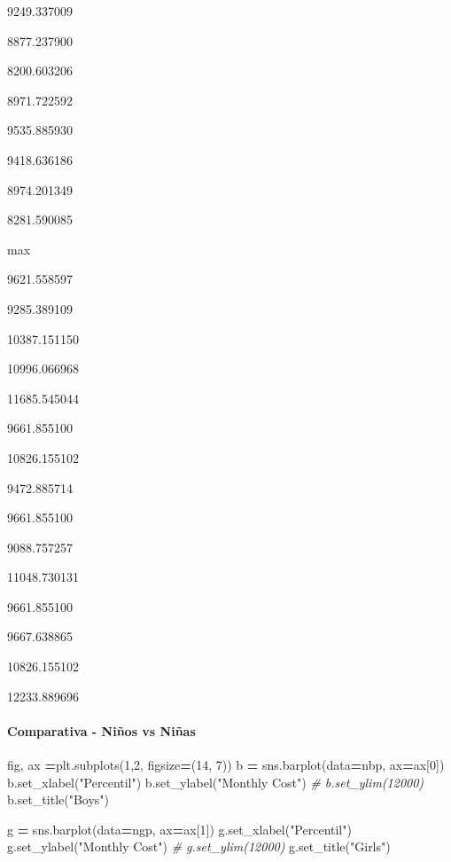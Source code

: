 \documentclass[
]{article}
\newenvironment{Shaded}{\begin{snugshade}}{\end{snugshade}}
\newcommand{\CommentTok}[1]{\textcolor[rgb]{0.56,0.35,0.01}{\textit{#1}}}
\newcommand{\DecValTok}[1]{\textcolor[rgb]{0.00,0.00,0.81}{#1}}
\newcommand{\NormalTok}[1]{#1}
\newcommand{\OperatorTok}[1]{\textcolor[rgb]{0.81,0.36,0.00}{\textbf{#1}}}
\newcommand{\StringTok}[1]{\textcolor[rgb]{0.31,0.60,0.02}{#1}}
\begin{document}
9249.337009

8877.237900

8200.603206

8971.722592

9535.885930

9418.636186

8974.201349

8281.590085

max

9621.558597

9285.389109

10387.151150

10996.066968

11685.545044

9661.855100

10826.155102

9472.885714

9661.855100

9088.757257

11048.730131

9661.855100

9667.638865

10826.155102

12233.889696

\hypertarget{comparativa---niuxf1os-vs-niuxf1as}{%
\paragraph{Comparativa - Niños vs
Niñas}\label{comparativa---niuxf1os-vs-niuxf1as}}

\begin{Shaded}
\begin{Highlighting}[]
\NormalTok{fig, ax }\OperatorTok{=}\NormalTok{plt.subplots(}\DecValTok{1}\NormalTok{,}\DecValTok{2}\NormalTok{, figsize}\OperatorTok{=}\NormalTok{(}\DecValTok{14}\NormalTok{, }\DecValTok{7}\NormalTok{))}
\NormalTok{b }\OperatorTok{=}\NormalTok{ sns.barplot(data}\OperatorTok{=}\NormalTok{nbp, ax}\OperatorTok{=}\NormalTok{ax[}\DecValTok{0}\NormalTok{])}
\NormalTok{b.set\_xlabel(}\StringTok{"Percentil"}\NormalTok{)}
\NormalTok{b.set\_ylabel(}\StringTok{"Monthly Cost"}\NormalTok{)}
\CommentTok{\# b.set\_ylim(12000)}
\NormalTok{b.set\_title(}\StringTok{"Boys"}\NormalTok{)}

\NormalTok{g }\OperatorTok{=}\NormalTok{ sns.barplot(data}\OperatorTok{=}\NormalTok{ngp, ax}\OperatorTok{=}\NormalTok{ax[}\DecValTok{1}\NormalTok{])}
\NormalTok{g.set\_xlabel(}\StringTok{"Percentil"}\NormalTok{)}
\NormalTok{g.set\_ylabel(}\StringTok{"Monthly Cost"}\NormalTok{)}
\CommentTok{\# g.set\_ylim(12000)}
\NormalTok{g.set\_title(}\StringTok{"Girls"}\NormalTok{)}
\end{Highlighting}
\end{Shaded}
\end{document}
